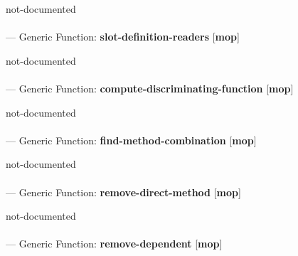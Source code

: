 \begin{adjustwidth}{5em}{5em}
not-documented
\end{adjustwidth}

\paragraph{}
\label{MOP:SLOT-DEFINITION-READERS}
--- Generic Function: \textbf{slot-definition-readers} [\textbf{mop}] \textit{}

\begin{adjustwidth}{5em}{5em}
not-documented
\end{adjustwidth}

\paragraph{}
\label{MOP:COMPUTE-DISCRIMINATING-FUNCTION}
--- Generic Function: \textbf{compute-discriminating-function} [\textbf{mop}] \textit{}

\begin{adjustwidth}{5em}{5em}
not-documented
\end{adjustwidth}

\paragraph{}
\label{MOP:FIND-METHOD-COMBINATION}
--- Generic Function: \textbf{find-method-combination} [\textbf{mop}] \textit{}

\begin{adjustwidth}{5em}{5em}
not-documented
\end{adjustwidth}

\paragraph{}
\label{MOP:REMOVE-DIRECT-METHOD}
--- Generic Function: \textbf{remove-direct-method} [\textbf{mop}] \textit{}

\begin{adjustwidth}{5em}{5em}
not-documented
\end{adjustwidth}

\paragraph{}
\label{MOP:REMOVE-DEPENDENT}
--- Generic Function: \textbf{remove-dependent} [\textbf{mop}] \textit{}

